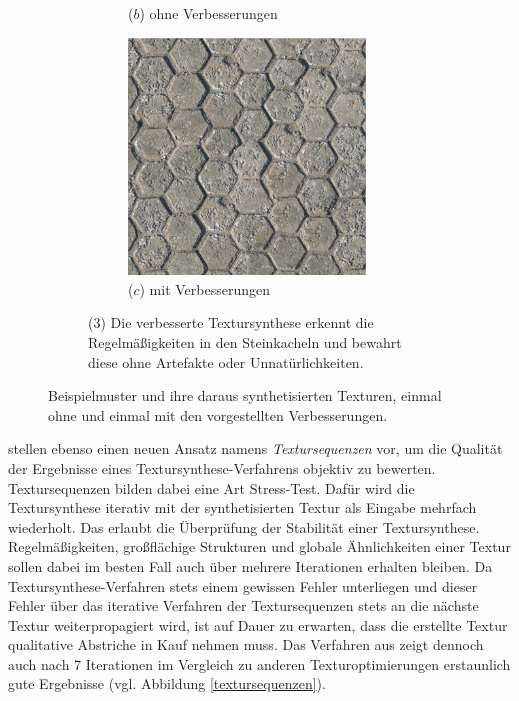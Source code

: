 \begin{figure}
\begin{subfigure}{0.9\textwidth}
\begin{subfigure}{0.3\textwidth}
		\caption*{($b$) ohne Verbesserungen}
	\end{subfigure}
	\hfill
	\begin{subfigure}{0.3\textwidth}
		\centering
		\includegraphics[width=0.9\textwidth]{images/example-3-with}
		\caption*{($c$) mit Verbesserungen}
	\end{subfigure}
	
	\caption*{($3$) Die verbesserte Textursynthese erkennt die Regelmäßigkeiten in den Steinkacheln und bewahrt diese ohne Artefakte oder Unnatürlichkeiten.}
\end{subfigure}

\label{examples}
\caption{Beispielmuster und ihre daraus synthetisierten Texturen, einmal ohne und einmal mit den vorgestellten Verbesserungen.}
\end{figure}

\cite{SelfTuning} stellen ebenso einen neuen Ansatz namens \emph{Textursequenzen} vor, um die Qualität der Ergebnisse eines Textursynthese-Verfahrens objektiv zu bewerten.
Textursequenzen bilden dabei eine Art \glqq Stress-Test\grqq.
Dafür wird die Textursynthese iterativ mit der synthetisierten Textur als Eingabe mehrfach wiederholt.
Das erlaubt die Überprüfung der Stabilität einer Textursynthese.
Regelmäßigkeiten, großflächige Strukturen und globale Ähnlichkeiten einer Textur sollen dabei im besten Fall auch über mehrere Iterationen erhalten bleiben.
Da Textursynthese-Verfahren stets einem gewissen Fehler unterliegen und dieser Fehler über das iterative Verfahren der Textursequenzen stets an die nächste Textur weiterpropagiert wird, ist auf Dauer zu erwarten, dass die erstellte Textur qualitative Abstriche in Kauf nehmen muss.
Das Verfahren aus \cite{SelfTuning} zeigt dennoch auch nach 7 Iterationen im Vergleich zu anderen Texturoptimierungen erstaunlich gute Ergebnisse (vgl. Abbildung \ref{textursequenzen}).

